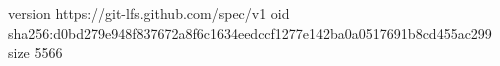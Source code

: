 version https://git-lfs.github.com/spec/v1
oid sha256:d0bd279e948f837672a8f6c1634eedccf1277e142ba0a0517691b8cd455ac299
size 5566
